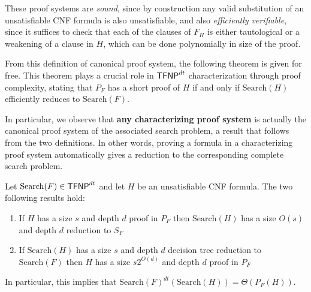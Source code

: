 These proof systems are \textit{sound}, since by construction any valid substitution of an unsatisfiable CNF formula is also unsatisfiable, and also \textit{efficiently verifiable}, since it suffices to check that each of the clauses of $F_H$ is either tautological or a weakening of a clause in $H$, which can be done polynomially in size of the proof.

From this definition of canonical proof system, the following theorem is given for free. This theorem plays a crucial role in $\mathsf{TFNP}^{dt}$ characterization through proof complexity, stating that $P_F$ has a short proof of $H$ if and only if $\mathrm{Search}(H)$ efficiently reduces to $\mathrm{Search}(F)$. 

In particular, we observe that \textbf{any characterizing proof system} is actually the canonical proof system of the associated search problem, a result that follows from the two definitions. In other words, proving a formula in a characterizing proof system automatically gives a reduction to the corresponding complete search problem.

\begin{theorem}
    Let $\mathrm{Search}(F) \in \mathsf{TFNP}^{dt}$ and let $H$ be an unsatisfiable CNF formula. The two following results hold:
    \begin{enumerate}
        \item If $H$ has a size $s$ and depth $d$ proof in $P_F$ then $\mathrm{Search}(H)$ has a size $O(s)$ and depth $d$ reduction to $S_F$
        \item If $\mathrm{Search}(H)$ has a size $s$ and depth $d$ decision tree reduction to $\mathrm{Search}(F)$ then $H$ has a size $s2^{O(d)}$ and depth $d$ proof in $P_F$
    \end{enumerate}
    In particular, this implies that $\mathrm{Search}(F)^{dt}(\mathrm{Search}(H)) = \Theta(P_F(H))$.
\end{theorem}

